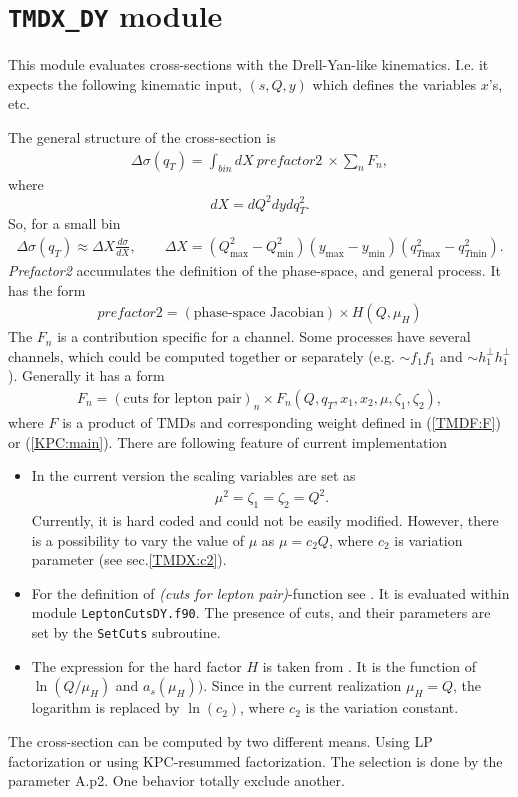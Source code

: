 \documentclass[prd,nofootinbib,eqsecnum,final]{revtex4}
\renewcommand{\(}{\left(}
\renewcommand{\)}{\right)}
\renewcommand{\[}{\left[}
\renewcommand{\]}{\right]}
\begin{document}
\newpage
\section{\texttt{TMDX{\_}DY} module}
\label{TMDX}

This module evaluates cross-sections with the Drell-Yan-like kinematics. I.e. it expects the following kinematic input, $(s,Q,y)$ which defines the variables $x$'s, etc.

The general structure of the cross-section is
\begin{eqnarray}
\Delta\sigma(q_T)=\int_{bin} dX ~prefactor2~\times \sum_n F_n,
\end{eqnarray}
where $$dX=dQ^2 dy d q^2_T.$$ So, for a small bin
\begin{eqnarray}
\Delta\sigma(q_T)\approx\Delta X \frac{d\sigma}{dX},\qquad \Delta X=(Q_{\text{max}}^2-Q_{\text{min}}^2)(y_{\text{max}}-y_{\text{min}})(q_{T\text{max}}^2-q_{T\text{min}}^2).
\end{eqnarray}
\textit{Prefactor2} accumulates the definition of the phase-space, and general process. It has the form
\begin{eqnarray}
prefactor2=(\text{phase-space Jacobian})\times H(Q,\mu_H)
\end{eqnarray}
The $F_n$ is a contribution specific for a channel. Some processes have several channels, which could be computed together or separately (e.g. $\sim f_1f_1$ and $\sim h_1^\perp h_1^\perp$). Generally it has a form
\begin{eqnarray}
F_n=(\text{cuts for lepton pair})_n\times F_n(Q,q_T,x_1,x_2,\mu,\zeta_1,\zeta_2),
\end{eqnarray}
where $F$ is a product of TMDs and corresponding weight defined in (\ref{TMDF:F}) or (\ref{KPC:main}). There are following feature of current implementation
\begin{itemize}
\item In the current version the scaling variables are set as
\begin{eqnarray}
\mu^2=\zeta_1=\zeta_2=Q^2.
\end{eqnarray}
Currently, it is hard coded and could not be easily modified. However, there is a possibility to vary the value of $\mu$ as $\mu=c_2 Q$, where $c_2$ is variation parameter (see sec.\ref{TMDX:c2}).
\item For the definition of \textit{(cuts for lepton pair)}-function see \cite{Scimemi:2017etj}. It is evaluated within module \texttt{LeptonCutsDY.f90}. The presence of cuts, and their parameters are set by the \texttt{SetCuts} subroutine.
\item The expression for the hard factor $H$ is taken from \cite{Gehrmann:2010ue}. It is the function of $\ln(Q/\mu_H)$ and $a_s(\mu_H))$. Since in the current realization $\mu_H=Q$, the logarithm is replaced by $\ln(c_2)$, where $c_2$ is the variation constant.
\end{itemize}
\begin{tcolorbox}
The cross-section can be computed by two different means. Using LP factorization or using KPC-resummed factorization. The selection is done by the parameter A.p2. One behavior totally exclude another.
\end{tcolorbox}
\end{document}
